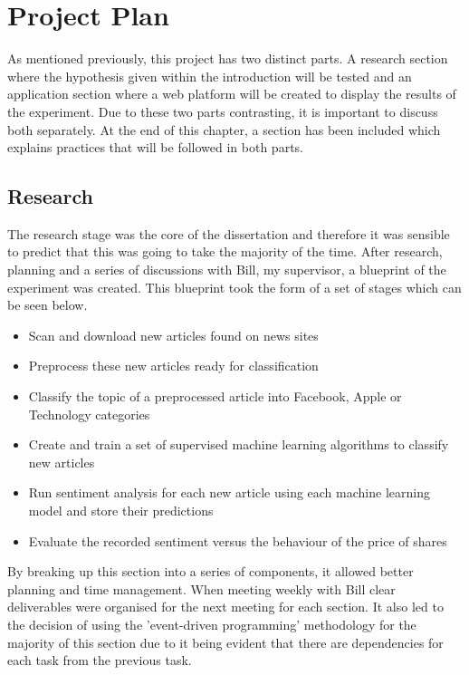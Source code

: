\documentclass[a4paper,11pt]{report}
\begin{document}
\chapter{Project Plan}
As mentioned previously, this project has two distinct parts. A research section where the hypothesis given within the introduction will be tested and an application section where a web platform will be created to display the results of the experiment. Due to these two parts contrasting, it is important to discuss both separately. At the end of this chapter, a section has been included which explains practices that will be followed in both parts.

\section{Research}
The research stage was the core of the dissertation and therefore it was sensible to predict that this was going to take the majority of the time. After research, planning and a series of discussions with Bill, my supervisor, a blueprint of the experiment was created. This blueprint took the form of a set of stages which can be seen below.

\begin{itemize}
    \item{Scan and download new articles found on news sites}
    \item{Preprocess these new articles ready for classification}
    \item{Classify the topic of a preprocessed article into Facebook, Apple or Technology categories}
    \item{Create and train a set of supervised machine learning algorithms to classify new articles}
    \item{Run sentiment analysis for each new article using each machine learning model and store their predictions}
    \item{Evaluate the recorded sentiment versus the behaviour of the price of shares}
\end{itemize}

By breaking up this section into a series of components, it allowed better planning and time management. When meeting weekly with Bill clear deliverables were organised for the next meeting for each section. It also led to the decision of using the 'event-driven programming' methodology for the majority of this section due to it being evident that there are dependencies for each task from the previous task.
\end{document}
